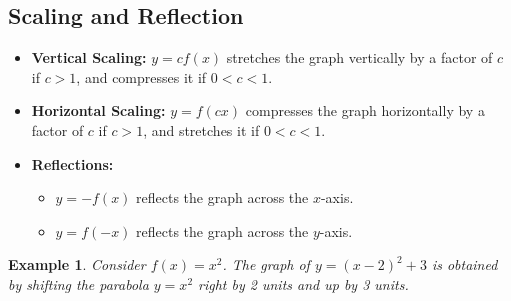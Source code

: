 \documentclass[11pt,a4paper]{article}
\newtheorem{example}{Example}
\begin{document}
\subsection{Scaling and Reflection}
\begin{itemize}
\item \textbf{Vertical Scaling:} $y = c f(x)$ stretches the graph vertically by a factor of $c$ if $c > 1$, and compresses it if $0 < c < 1$.
\item \textbf{Horizontal Scaling:} $y = f(cx)$ compresses the graph horizontally by a factor of $c$ if $c > 1$, and stretches it if $0 < c < 1$.
\item \textbf{Reflections:} 
\begin{itemize}
\item $y = -f(x)$ reflects the graph across the $x$-axis.
\item $y = f(-x)$ reflects the graph across the $y$-axis.
\end{itemize}
\end{itemize}
\begin{example}
Consider $f(x) = x^2$. The graph of $y = (x-2)^2 + 3$ is obtained by shifting the parabola $y = x^2$ right by 2 units and up by 3 units.
\end{example}
\end{document}
